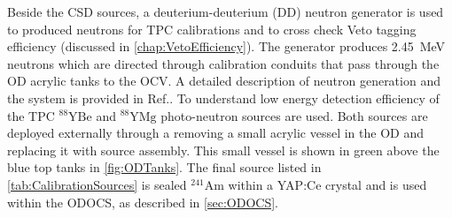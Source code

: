 Beside the CSD sources, a deuterium-deuterium (DD) neutron generator is used to produced neutrons for TPC calibrations and to cross check Veto tagging efficiency (discussed in \autoref{chap:VetoEfficiency}). The generator produces 2.45~MeV neutrons which are directed through calibration conduits that pass through the OD acrylic tanks to the OCV. A detailed description of neutron generation and the system is provided in Ref.\cite{LZ:2024bsz}. To understand low energy detection efficiency of the TPC $^{88}\text{YBe}$ and $^{88}\text{YMg}$ photo-neutron sources are used. Both sources are deployed externally through a removing a small acrylic vessel in the OD and replacing it with source assembly. This small vessel is shown in green above the blue top tanks in  \autoref{fig:ODTanks}.
The final source listed in \autoref{tab:CalibrationSources} is sealed $^{241}\text{Am}$ within a YAP:Ce crystal and is used within the ODOCS, as described in \autoref{sec:ODOCS}.

